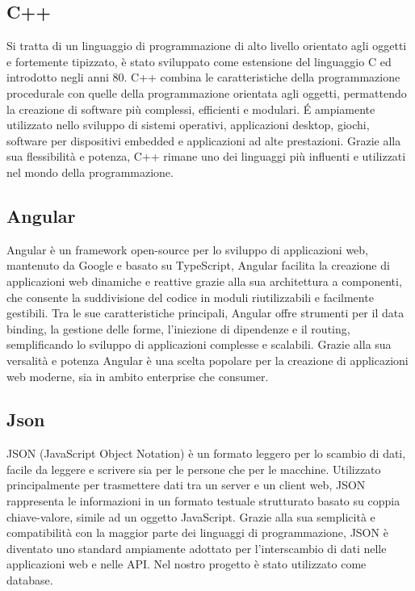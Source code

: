 \documentclass[a4paper, 11pt,oneside,]{book}
\begin{document}
        \subsection{C++}
            Si tratta di un linguaggio di programmazione di alto livello orientato agli oggetti e fortemente tipizzato, è stato sviluppato come estensione del linguaggio C ed introdotto negli anni 80.
            C++ combina le caratteristiche della programmazione procedurale con quelle della programmazione orientata agli oggetti, permattendo la creazione di software più complessi, efficienti e modulari.
            \'E ampiamente utilizzato nello sviluppo di sistemi operativi, applicazioni desktop, giochi, software per dispositivi embedded e applicazioni ad alte prestazioni. Grazie alla sua flessibilità e potenza, C++ rimane
            uno dei linguaggi più influenti e utilizzati nel mondo della programmazione.
        \subsection{Angular}
            Angular è un framework open-source per lo sviluppo di applicazioni web, mantenuto da Google e basato su TypeScript, Angular facilita la creazione di applicazioni web dinamiche e reattive grazie alla sua architettura
            a componenti, che consente la suddivisione del codice in moduli riutilizzabili e facilmente gestibili. Tra le sue caratteristiche principali, Angular offre strumenti per il data binding, la gestione delle forme, l'iniezione
            di dipendenze e il routing, semplificando lo sviluppo di applicazioni complesse e scalabili. Grazie alla sua versalità e potenza Angular è una scelta popolare per la creazione di applicazioni web moderne, sia in ambito 
            enterprise che consumer.
        \subsection{Json}
            JSON (JavaScript Object Notation) è un formato leggero per lo scambio di dati, facile da leggere e scrivere sia per le persone che per le macchine. Utilizzato principalmente per trasmettere dati tra un server e un client web, JSON
            rappresenta le informazioni in un formato testuale strutturato basato su coppia chiave-valore, simile ad un oggetto JavaScript. Grazie alla sua semplicità e compatibilità con la maggior parte dei linguaggi di programmazione, JSON è
            diventato uno standard ampiamente adottato per l'interscambio di dati nelle applicazioni web e nelle API. Nel nostro progetto è stato utilizzato come database.
\end{document}
